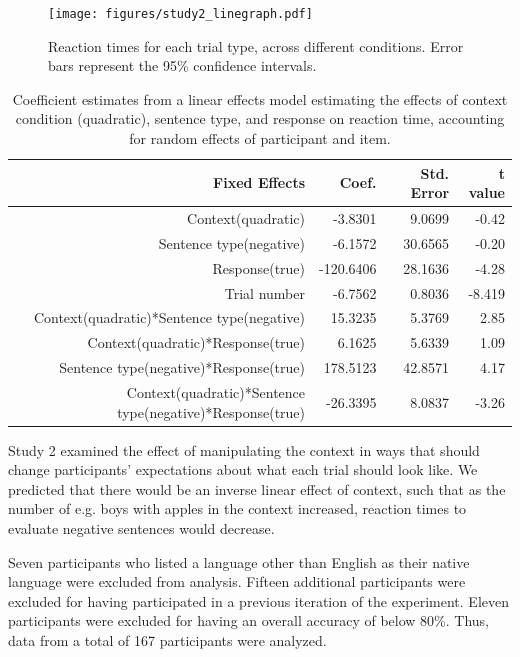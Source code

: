 \documentclass[10pt,letterpaper]{article}
\begin{document}
\begin{figure}
\begin{center} 
\texttt{[image: figures/study2\_linegraph.pdf]}
\caption{\label{fig:addition_subs} Reaction times for each trial type, across different conditions.  Error bars represent the 95\% confidence intervals.}
\end{center} 
\end{figure}

\begin{table}[t]
\caption{Coefficient estimates from a linear effects model estimating the effects of context condition (quadratic), sentence type, and response on reaction time, accounting for random effects of participant and item.}
\begin{center}
\small\addtolength{\tabcolsep}{-5pt}
\begin{tabular}{ r  r  r  r  } 
\hline
  \bf{Fixed Effects} & \bf{Coef.} & \bf{Std. Error} & \bf{t value} \\ \hline             
Context(quadratic) &-3.8301 & 9.0699 & -0.42\\
Sentence type(negative) &  -6.1572 & 30.6565 & -0.20\\
Response(true) & -120.6406 &   28.1636 &  -4.28\\
Trial number & -6.7562   &  0.8036  & -8.419\\
Context(quadratic)*Sentence type(negative)&15.3235  &   5.3769  &  2.85\\
Context(quadratic)*Response(true) & 6.1625  &   5.6339  &  1.09\\
Sentence type(negative)*Response(true) &  178.5123 &   42.8571  &  4.17\\
Context(quadratic)*Sentence type(negative)*Response(true) & -26.3395  &   8.0837 &  -3.26\\
\hline
\end{tabular}
\end{center}
\end{table}


Study 2 examined the effect of manipulating the context in ways that should change participants' expectations about what each trial should look like.  We predicted that there would be an inverse linear effect of context, such that as the number of e.g. boys with apples in the context increased, reaction times to evaluate negative sentences would decrease.  

Seven participants who listed a language other than English as their native language were excluded from analysis.  Fifteen additional participants were excluded for having participated in a previous iteration of the experiment.  Eleven participants were excluded for having an overall accuracy of below 80\%.  Thus, data from a total of 167 participants were analyzed.  
\end{document}
